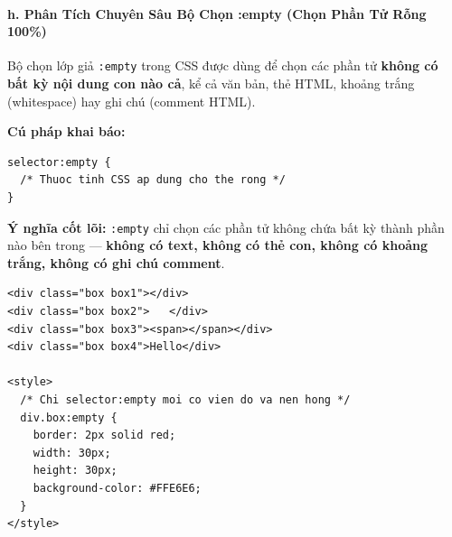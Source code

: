 \documentclass[11pt,oneside]{book}
\newcommand{\codeinline}[1]{\textcolor{accentOrange}{\texttt{#1}}}
\begin{document}

\paragraph{h. Phân Tích Chuyên Sâu Bộ Chọn :empty (Chọn Phần Tử Rỗng 100\%)}
\mbox{}\par\vspace{2pt}

Bộ chọn lớp giả \codeinline{:empty} trong CSS được dùng để chọn các phần tử \textbf{không có bất kỳ nội dung con nào cả}, kể cả văn bản, thẻ HTML, khoảng trắng (whitespace) hay ghi chú (comment HTML).

\begin{conceptBox}
\textbf{Cú pháp khai báo:}
\begin{codeWindow}
\begin{lstlisting}[language=CSS3]
selector:empty {
  /* Thuoc tinh CSS ap dung cho the rong */
}
\end{lstlisting}
\end{codeWindow}
\par\vspace{4pt}
\textbf{Ý nghĩa cốt lõi:} \codeinline{:empty} chỉ chọn các phần tử không chứa bất kỳ thành phần nào bên trong --- \textbf{không có text, không có thẻ con, không có khoảng trắng, không có ghi chú comment}.
\end{conceptBox}

\begin{codeWindow}
\begin{lstlisting}[language=HTML5]
<div class="box box1"></div>
<div class="box box2">   </div>
<div class="box box3"><span></span></div>
<div class="box box4">Hello</div>

<style>
  /* Chi selector:empty moi co vien do va nen hong */
  div.box:empty {
    border: 2px solid red;
    width: 30px;
    height: 30px;
    background-color: #FFE6E6;
  }
</style>
\end{lstlisting}
\end{codeWindow}
\end{document}
